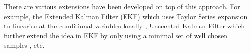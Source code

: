 There are various extensions have been developed on top of this approach. For example, the Extended Kalman Filter (EKF) which uses Taylor Series expansion to linearise at the conditional variables locally \cite{WG95}, Unscented Kalman Filter which further extend the idea in EKF by only using a minimal set of well chosen samples \cite{EW01}, etc.

\endinput



